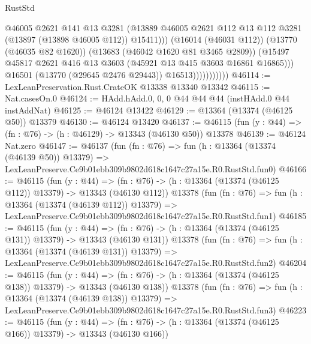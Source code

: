 \begin{lexlean}{RustStd}
\begin{coremodule}
                                @46005
                                @2621
                                @141
                                @13
                                @3281
                                (@13889
                                  @46005
                                  @2621
                                  @112
                                  @13
                                  @112
                                  @3281
                                  (@13897 (@13898 @46005 @112))
                                  @15411)))
                            (@16014 (@46031 @112))
                            (@13770 (@46035 @82 @1620))
                            (@13683 (@46042 @1620 @81 @3465 @2809))
                            (@15497
                              @45817
                              @2621
                              @416
                              @13
                              @3603
                              (@45921 @13 @415 @3603 @16861 @16865)))
                          @16501
                          (@13770 (@29645 @2476 @29443))
                          @16513)))))))))))
@46114 := LexLeanPreservation.Rust.CrateOK @13338 @13340 @13342
@46115 := Nat.casesOn.{0}
@46124 := HAdd.hAdd.{0, 0, 0} @44 @44 @44 (instHAdd.{0} @44 instAddNat)
@46125 := @46124 @13422
@46129 := @13364 (@13374 (@46125 @50)) @13379
@46130 := @46124 @13420
@46137 := @46115 (fun (y : @44) => (fn : @76) -> (h : @46129) -> @13343 (@46130 @50)) @13378
@46139 := @46124 Nat.zero
@46147 := @46137
    (fun (fn : @76) =>
    fun (h : @13364 (@13374 (@46139 @50)) @13379) =>
    LexLeanPreserve.Ce9b01ebb309b9802d618c1647c27a15e.R0.RustStd.fun0)
@46166 := @46115
    (fun (y : @44) =>
    (fn : @76) -> (h : @13364 (@13374 (@46125 @112)) @13379) -> @13343 (@46130 @112))
    @13378
    (fun (fn : @76) =>
    fun (h : @13364 (@13374 (@46139 @112)) @13379) =>
    LexLeanPreserve.Ce9b01ebb309b9802d618c1647c27a15e.R0.RustStd.fun1)
@46185 := @46115
    (fun (y : @44) =>
    (fn : @76) -> (h : @13364 (@13374 (@46125 @131)) @13379) -> @13343 (@46130 @131))
    @13378
    (fun (fn : @76) =>
    fun (h : @13364 (@13374 (@46139 @131)) @13379) =>
    LexLeanPreserve.Ce9b01ebb309b9802d618c1647c27a15e.R0.RustStd.fun2)
@46204 := @46115
    (fun (y : @44) =>
    (fn : @76) -> (h : @13364 (@13374 (@46125 @138)) @13379) -> @13343 (@46130 @138))
    @13378
    (fun (fn : @76) =>
    fun (h : @13364 (@13374 (@46139 @138)) @13379) =>
    LexLeanPreserve.Ce9b01ebb309b9802d618c1647c27a15e.R0.RustStd.fun3)
@46223 := @46115
    (fun (y : @44) =>
    (fn : @76) -> (h : @13364 (@13374 (@46125 @166)) @13379) -> @13343 (@46130 @166))

\end{coremodule}
\end{lexlean}
